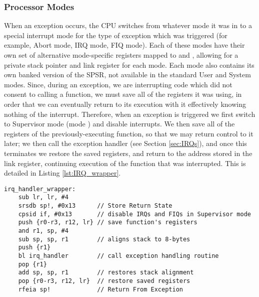     \subsubsection{Processor Modes}
        \label{sec:CPU_modes}
        When an exception occurs, the CPU switches from whatever mode it was in
        to a special interrupt mode for the type of exception which was
        triggered (for example, Abort mode, IRQ mode, FIQ mode). Each of these
        modes have their own set of alternative mode-specific registers mapped
        to  and  \cite[pg.2-19]{TRM}, allowing for a private
        stack pointer and link register for each mode. Each mode also contains
        its own banked version of the SPSR, not available in the standard User
        and System modes. Since, during an exception, we are interrupting code
        which did not consent to calling a function, we must save all of the
        registers it was using, in order that we can eventually return to its
        execution with it effectively knowing nothing of the interrupt.
        Therefore, when an exception is triggered we first switch to Supervisor
        mode (mode ) and disable interrupts. We then save all of the
        registers of the previously-executing function, so that we may return
        control to it later; we then call the exception handler (see Section
        \ref{sec:IRQs}), and once this terminates we restore the saved
        registers, and return to the address stored in the link register,
        continuing execution of the function that was interrupted. This is
        detailed in Listing \ref{lst:IRQ_wrapper}.

        \lstset{language=c}
        \begin{lstlisting}[caption={The setup and cleanup for dealing with an
        exception},captionpos=b,label={lst:IRQ_wrapper}]
irq_handler_wrapper:
    sub lr, lr, #4      
    srsdb sp!, #0x13      // Store Return State
    cpsid if, #0x13       // disable IRQs and FIQs in Supervisor mode
    push {r0-r3, r12, lr} // save function's registers
    and r1, sp, #4        
    sub sp, sp, r1        // aligns stack to 8-bytes
    push {r1}
    bl irq_handler        // call exception handling routine
    pop {r1}
    add sp, sp, r1        // restores stack alignment
    pop {r0-r3, r12, lr}  // restore saved registers
    rfeia sp!             // Return From Exception
        \end{lstlisting}

